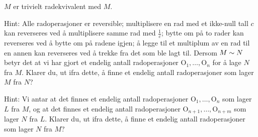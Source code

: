 \begin{losning}
\begin{punkt}
	$M$ er trivielt radekvivalent med $M$.
\end{punkt}
\begin{punkt}
	Hint: Alle radoperasjoner er reversible; multiplisere en rad med et ikke-null tall $c$ kan reverseres ved å multiplisere samme rad med $\frac{1}{c}$; bytte om på to rader kan reverseres ved å bytte om på radene igjen; å legge til et multiplum av en rad til en annen kan reverseres ved å trekke fra det som ble lagt til. Dersom $M\sim N$ betyr det at vi har gjort et endelig antall radoperasjoner $\text{O}_1,\dots,\text{O}_n$ for å lage $N$ fra $M$. Klarer du, ut ifra dette, å finne et endelig antall radoperasjoner som lager $M$ fra $N$?
\end{punkt}
\begin{punkt}
	Hint: Vi antar at det finnes et endelig antall radoperasjoner $\text{O}_1,\dots,\text{O}_n$ som lager $L$ fra $M$, og at det finnes et endelig antall radoperasjoner $\text{O}_{n+1},\dots,\text{O}_{n+m}$ som lager $N$ fra $L$. Klarer du, ut ifra dette, å finne et endelig antall radoperasjoner som lager $N$ fra $M$?
\end{punkt}
\end{losning}
